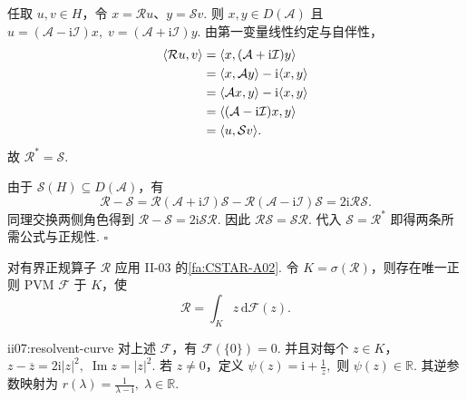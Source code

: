 \begin{FAProof}
任取 \(\displaystyle u,v\in H\)，令 \(\displaystyle x=\mathcal Ru\)、\(\displaystyle y=\mathcal Sv\). 则 \(\displaystyle x,y\in D(\mathcal A)\) 且
\(\displaystyle u=(\mathcal A-\mathrm{i}\mathcal I)x, \; v=(\mathcal A+\mathrm{i}\mathcal I)y.\)
由第一变量线性约定与自伴性，
\[
\begin{aligned}
\displaystyle \langle\mathcal Ru,v\rangle &\displaystyle =\langle x,(\mathcal A+\mathrm{i}\mathcal I)y\rangle\\
\displaystyle &\displaystyle =\langle x,\mathcal Ay\rangle-\mathrm{i}\langle x,y\rangle\\
\displaystyle &\displaystyle =\langle\mathcal Ax,y\rangle-\mathrm{i}\langle x,y\rangle\\
\displaystyle &\displaystyle =\langle(\mathcal A-\mathrm{i}\mathcal I)x,y\rangle\\
\displaystyle &\displaystyle =\langle u,\mathcal Sv\rangle.
\end{aligned}
\]
故 \(\displaystyle\mathcal R^*=\mathcal S\).

由于 \(\displaystyle\mathcal S(H)\subseteq D(\mathcal A)\)，有
\[
\mathcal R-\mathcal S=\mathcal R(\mathcal A+\mathrm{i}\mathcal I)\mathcal S-\mathcal R(\mathcal A-\mathrm{i}\mathcal I)\mathcal S=2\mathrm{i}\mathcal R\mathcal S.
\]
同理交换两侧角色得到 \(\displaystyle\mathcal R-\mathcal S=2\mathrm{i}\mathcal S\mathcal R\). 因此 \(\displaystyle\mathcal R\mathcal S=\mathcal S\mathcal R\). 代入 \(\displaystyle\mathcal S=\mathcal R^*\) 即得两条所需公式与正规性.
\hfill\(\square\)
\end{FAProof}

对有界正规算子 \(\displaystyle\mathcal R\) 应用 II-03 的\autoref{fa:CSTAR-A02}. 令 \(\displaystyle K=\sigma(\mathcal R)\)，则存在唯一正则 PVM \(\displaystyle\mathcal F\) 于 \(\displaystyle K\)，使
\[
\mathcal R
=
\int_K z\,\mathrm{d}\mathcal F(z).
\]

\begin{FAProposition}[B][预解谱曲线与零原子]{ii07:resolvent-curve}
对上述 \(\displaystyle\mathcal F\)，有
\(\displaystyle \mathcal F(\{0\})=0.\)
并且对每个 \(\displaystyle z\in K\)，
\(\displaystyle z-\overline z=2\mathrm{i}|z|^2, \; \operatorname{Im}z=|z|^2.\)
若 \(\displaystyle z\neq0\)，定义
\(\displaystyle \psi(z)=\mathrm{i}+\frac1z,\)
则 \(\displaystyle\psi(z)\in\mathbb R\). 其逆参数映射为
\(\displaystyle r(\lambda)=\frac1{\lambda-\mathrm{i}}, \; \lambda\in\mathbb R.\)
\end{FAProposition}

